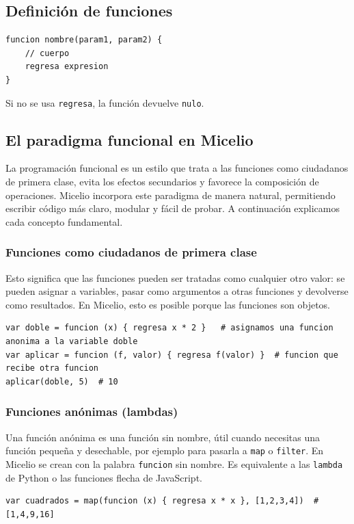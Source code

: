 \documentclass[12pt]{article}
\begin{document}
\subsection{Definición de funciones}
\begin{lstlisting}
funcion nombre(param1, param2) {
    // cuerpo
    regresa expresion
}
\end{lstlisting}
Si no se usa \texttt{regresa}, la función devuelve \texttt{nulo}.

\subsection{El paradigma funcional en Micelio}

La programación funcional es un estilo que trata a las funciones como ciudadanos de primera clase, evita los efectos secundarios y favorece la composición de operaciones. Micelio incorpora este paradigma de manera natural, permitiendo escribir código más claro, modular y fácil de probar. A continuación explicamos cada concepto fundamental.

\subsubsection*{Funciones como ciudadanos de primera clase}
Esto significa que las funciones pueden ser tratadas como cualquier otro valor: se pueden asignar a variables, pasar como argumentos a otras funciones y devolverse como resultados. En Micelio, esto es posible porque las funciones son objetos.

\begin{lstlisting}
var doble = funcion (x) { regresa x * 2 }   # asignamos una funcion anonima a la variable doble
var aplicar = funcion (f, valor) { regresa f(valor) }  # funcion que recibe otra funcion
aplicar(doble, 5)  # 10
\end{lstlisting}

\subsubsection*{Funciones anónimas (lambdas)}
Una función anónima es una función sin nombre, útil cuando necesitas una función pequeña y desechable, por ejemplo para pasarla a \texttt{map} o \texttt{filter}. En Micelio se crean con la palabra \texttt{funcion} sin nombre. Es equivalente a las \texttt{lambda} de Python o las funciones flecha de JavaScript.

\begin{lstlisting}
var cuadrados = map(funcion (x) { regresa x * x }, [1,2,3,4])  # [1,4,9,16]
\end{lstlisting}
\end{document}
